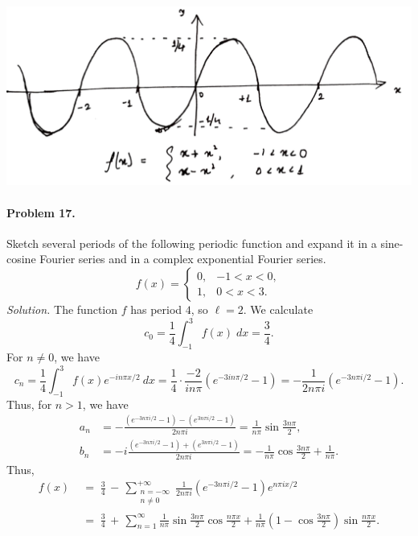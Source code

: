 \documentclass[10pt]{article}
\begin{document}
        \begin{center}
                \includegraphics[scale=0.4]{./6_15.png}
        \end{center}
        
        \paragraph{Problem 17.} Sketch several periods of the following periodic function and expand it in a sine-cosine Fourier series and in a 
        complex exponential Fourier series.
        \[
                f(x) = \begin{cases}
                        0, & -1 < x < 0, \\
                        1, & 0 < x < 3.
                \end{cases}
        \]
        \textit{Solution.} The function $f$ has period $4$, so $\ell = 2$.
        We calculate
        \[
                c_0 = \frac{1}{4}\int_{-1}^3 f(x) \;dx = \frac{3}{4}.
        \]
        For $n \neq 0$, we have
        \[
                c_n = \frac{1}{4}\int_{-1}^3 f(x)e^{-in\pi x /2}\:dx = \frac{1}{4}\cdot \frac{-2}{in\pi}(e^{-3in\pi /2} - 1)
                        = -\frac{1}{2n\pi i} (e^{-3n\pi i /2} - 1).
        \]
        Thus, for $n > 1$, we have
        \begin{align*}
                a_n &= -\frac{(e^{-3n\pi i/2} - 1) - (e^{3n\pi i /2} - 1)}{2n\pi i} = \frac{1}{n\pi}\sin\frac{3n\pi}{2}, \\
                b_n &= -i\frac{(e^{-3n\pi i /2} - 1) + (e^{3n\pi i/2} - 1)}{2n\pi i} = -\frac{1}{n\pi}\cos\frac{3n\pi}{2} + \frac{1}{n\pi}.
        \end{align*}    
        Thus,
        \begin{align*}
                f(x) \;&=\; \frac{3}{4} \,-\, \sum_{\substack{n = -\infty \\ n \neq 0}}^{+\infty} \frac{1}{2n\pi i}(e^{-3n\pi i/2} - 1)e^{n\pi ix /2} \\
                        \;&=\; \frac{3}{4} \,+\, \sum_{n = 1}^\infty \frac{1}{n\pi}\sin\frac{3n\pi}{2}\cos\frac{n\pi x}{2} +
                                \frac{1}{n\pi}\left(1 - \cos\frac{3n\pi}{2}\right)\sin\frac{n\pi x}{2}. \tag{$\star$}
        \end{align*}
\end{document}
